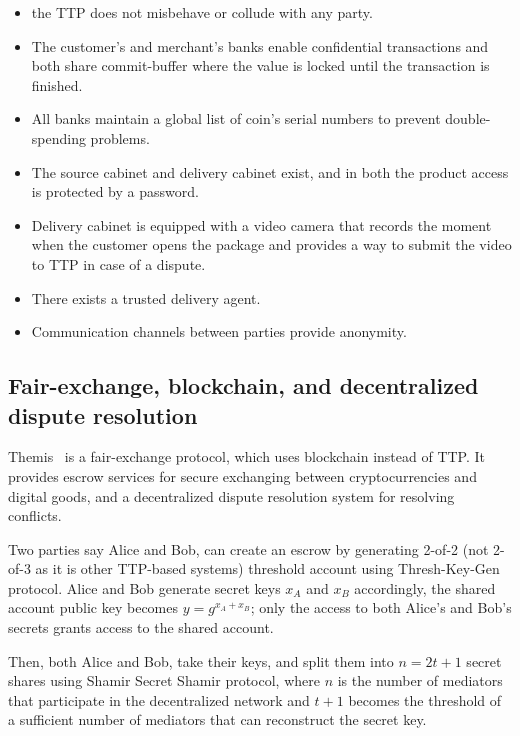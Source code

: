 \documentclass{ieeeaccess}
\begin{document}
\begin{itemize}
    \item the TTP does not misbehave or collude with any party. 
    \item The customer's and merchant's banks enable confidential transactions and both share commit-buffer where the value is locked until the transaction is finished.   
    \item All banks maintain a global list of coin's serial numbers to prevent double-spending problems. 
    \item The source cabinet and delivery cabinet exist, and in both the product access is protected by a password.
    \item Delivery cabinet is equipped with a video camera that records the moment when the customer opens the package and provides a way to submit the video to TTP in case of a dispute. 
    \item There exists a trusted delivery agent.
    \item Communication channels between parties provide anonymity.
\end{itemize}

\subsection{Fair-exchange, blockchain, and decentralized dispute resolution}
\label{themis-towards-decentralized-escrow-of-cryptocurrencies-without-trusted-third-parties}

Themis~\cite{meng2019themis} is a fair-exchange
protocol, which uses blockchain instead of TTP. It provides escrow
services for secure exchanging between cryptocurrencies and digital goods, and a decentralized dispute resolution system for resolving conflicts.

Two parties say Alice and Bob, can create an escrow by generating
2-of-2 (not 2-of-3 as it is other TTP-based systems) threshold account
using Thresh-Key-Gen protocol. Alice and Bob generate secret keys
\(x_A\) and \(x_B\) accordingly, the shared account public key becomes
\(y = g^{x_A+x_B}\); only the access to both Alice's and Bob's secrets
grants access to the shared account.

Then, both Alice and Bob, take their keys, and split them into
\(n=2t+1\) secret shares using Shamir Secret Shamir protocol, where
\(n\) is the number of mediators that participate in the decentralized
network and \(t+1\) becomes the threshold of a sufficient number of
mediators that can reconstruct the secret key.
\end{document}
